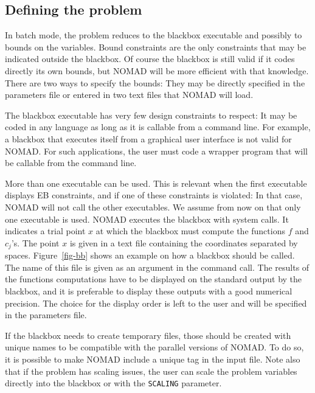 \documentclass[12pt,english]{article}
\newcommand{\nomad}{NOMAD\xspace}
\newcommand{\bb}{blackbox\xspace}
\begin{document}
  \subsection*{Defining the problem}
  \label{sec-bb}

In batch mode, the problem reduces to the \bb executable
  and possibly to bounds on the variables.
Bound constraints are the only constraints that may be indicated outside
  the \bb.
Of course the \bb is still valid if it codes directly its own bounds,
  but \nomad will be more efficient with that knowledge.
There are two ways to specify the bounds: They may be directly specified
  in the parameters file or entered in two text files that \nomad will load.

The \bb executable has very few design constraints to respect:
  It may be coded in any language as long as it is callable from a
  command line.
For example, a \bb that executes itself from a graphical user interface is
  not valid for \nomad.
For such applications, the user must code a wrapper program that will
  be callable from the
  command line.

More than one executable can be used.
 This is relevant when the first executable displays EB constraints, and
 if one of
 these constraints is violated: In that case,
  \nomad will not call the other executables.
We assume from now on that only one executable is used.
 \nomad executes the \bb with system calls. It indicates a trial point
   $x$ at which the \bb must compute the functions $f$ and $c_j$'s.
 The point $x$ is given in a text file containing the coordinates
   separated by spaces.
 Figure~\ref{fig-bb} shows an example on how a \bb should be called.
 The name of this file is given as an argument in the command call.
 The results of the functions computations have
 to be displayed on the standard output by the \bb, and
 it is preferable to display these outputs with a good numerical precision.
 The choice for the display order
   is left to the user and will be specified in the parameters file.

 If the \bb needs to create temporary files, those should be created with
     unique names to be compatible with the parallel versions of \nomad.
     To do so, it is possible to make \nomad include a unique tag
           in the input file.
Note also that %
          if the problem has scaling issues,
          the user can scale the problem variables
          directly into the \bb or with the \texttt{SCALING} parameter.
\end{document}
